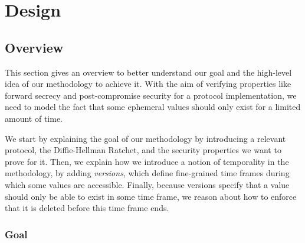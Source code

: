 
\chapter{Design}



\section{Overview}
\label{sec:overview}

This section gives an overview to better understand our goal and the high-level idea of our methodology to achieve it.
With the aim of verifying properties like forward secrecy and post-compromise security for a protocol implementation, we need to model the fact that some ephemeral values should only exist for a limited amount of time.

We start by explaining the goal of our methodology by introducing a relevant protocol, the Diffie-Hellman Ratchet, and the security properties we want to prove for it.
Then, we explain how we introduce a notion of temporality in the methodology, by adding  \emph{versions}, which define fine-grained time frames during which some values are accessible.
Finally, because versions specify that a value should only be able to exist in some time frame, we reason about how to enforce that it is deleted before this time frame ends.

\subsection{Goal}
\label{sec:goal}

